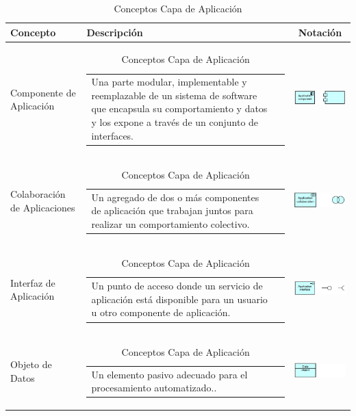 \begin{longtable}[c]{|p{2.5cm}|l|c|}
	\caption{Conceptos Capa de Aplicación}
	\label{my-label}\\
	\hline
	\textbf{Concepto} 			& \textbf{Descripción}                                                                                                                                            & \textbf{Notación} \\ \hline
	\endhead
	Componente de Aplicación	& \begin{tabular}[c]{p{7cm}@{}l@{}}Una parte modular, implementable y reemplazable de un sistema de software que encapsula su comportamiento y datos y los expone a través de un conjunto de interfaces.\end{tabular}                                                    & \includegraphics[width=35mm]{arquitectura/adm_lenguaje/imgs/application/ApplicationComponent}           \\ \hline
	Colaboración de Aplicaciones& \begin{tabular}[c]{p{7cm}@{}l@{}}Un agregado de dos o más componentes de aplicación que trabajan juntos para realizar un comportamiento colectivo.\end{tabular} & \includegraphics[width=35mm]{arquitectura/adm_lenguaje/imgs/application/ApplicationCollaboration}          \\ \hline
	Interfaz de Aplicación		& \begin{tabular}[c]{p{7cm}@{}l@{}}Un punto de acceso donde un servicio de aplicación está disponible para un usuario u otro componente de aplicación.\end{tabular} & \includegraphics[width=35mm]{arquitectura/adm_lenguaje/imgs/application/ApplicationInterface}          \\ \hline
	Objeto de Datos				& \begin{tabular}[c]{p{7cm}@{}l@{}}Un elemento pasivo adecuado para el procesamiento automatizado..\end{tabular} & \includegraphics[width=35mm]{arquitectura/adm_lenguaje/imgs/application/DataObject}          \\ \hline

\end{longtable}
